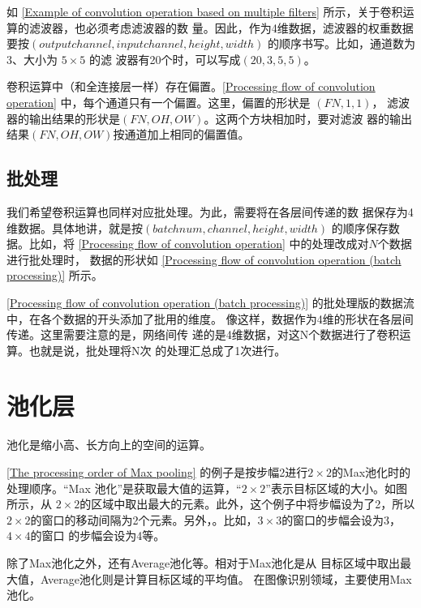 如 \autoref{Example of convolution operation based on multiple filters} 所示，关于卷积运算的滤波器，也必须考虑滤波器的数
量。因此，作为4维数据，滤波器的权重数据要按$(output channel, input channel, height, width)$ 的顺序书写。比如，通道数为 3、大小为 $5 \times 5$ 的滤
波器有20个时，可以写成$(20, 3, 5, 5)$。

卷积运算中（和全连接层一样）存在偏置。\autoref{Processing flow of convolution operation} 中，每个通道只有一个偏置。这里，偏置的形状是 $(FN, 1, 1)$，
滤波器的输出结果的形状是$(FN, OH, OW)$。这两个方块相加时，要对滤波
器的输出结果$(FN, OH, OW)$按通道加上相同的偏置值。


\subsection{批处理}
我们希望卷积运算也同样对应批处理。为此，需要将在各层间传递的数
据保存为4维数据。具体地讲，就是按$(batch num, channel, height, width)$
的顺序保存数据。比如，将 \autoref{Processing flow of convolution operation} 中的处理改成对$N$个数据进行批处理时，
数据的形状如 \autoref{Processing flow of convolution operation (batch processing)} 所示。


\autoref{Processing flow of convolution operation (batch processing)} 的批处理版的数据流中，在各个数据的开头添加了批用的维度。
像这样，数据作为4维的形状在各层间传递。这里需要注意的是，网络间传
递的是4维数据，对这N个数据进行了卷积运算。也就是说，批处理将N次
的处理汇总成了1次进行。
\section{池化层}
池化是缩小高、长方向上的空间的运算。


\autoref{The processing order of Max pooling} 的例子是按步幅2进行$2 \times 2$的Max池化时的处理顺序。“Max
池化”是获取最大值的运算，“$2 \times 2$”表示目标区域的大小。如图所示，从
$2 \times 2$的区域中取出最大的元素。此外，这个例子中将步幅设为了2，所以
$2 \times 2$的窗口的移动间隔为2个元素。另外，。比如，$3 \times 3$的窗口的步幅会设为3，$4 \times 4$的窗口
的步幅会设为4等。

\begin{tcolorbox}
    除了Max池化之外，还有Average池化等。相对于Max池化是从
    目标区域中取出最大值，Average池化则是计算目标区域的平均值。
    在图像识别领域，主要使用Max池化。
\end{tcolorbox}


